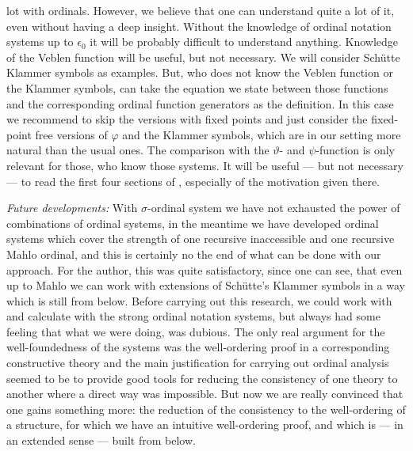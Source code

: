 \documentclass[10pt]{article}
\begin{document}
lot with
ordinals. However, we believe that one can understand quite a lot of it,
even without having a deep insight. Without the knowledge of 
ordinal notation systems up to $\epsilon_0$ it will be probably
difficult to understand
anything. Knowledge of the Veblen function will be 
useful, but not necessary. We will consider
Sch{\"u}tte Klammer symbols as
examples.
But, who does not know the Veblen function or the Klammer symbols,
can take the equation we state between
those functions and the corresponding
ordinal function generators as the definition. In this case 
we  recommend to skip the versions with fixed points and just consider the
fixed-point free versions of $\varphi$ and the Klammer symbols, which
are in our setting more natural than the usual ones.
The comparison with the $\vartheta$-
and $\psi$-function is only relevant for those, who know those systems.
It will be useful --- but not necessary ---   to read the 
first four sections of \cite{setzvenedig}, especially of the  motivation
given there.\par  
{\em Future developments:} With $\sigma$-ordinal system we have not exhausted the power of 
combinations of ordinal systems, in the meantime we have 
developed ordinal systems which cover the strength of 
one recursive inaccessible and one recursive Mahlo ordinal, and
this is certainly
no the end of what can be done with our approach. For the author, this was 
quite satisfactory, since one can see, that even up to Mahlo we can work
with extensions of Sch{\"u}tte's Klammer symbols in a way which is still
from below. Before carrying out this research,
we  could work with and calculate with the strong
ordinal notation systems, but always had some feeling that what we
were doing, was dubious. The only real argument for the
well-foundedness of the systems was the 
well-ordering proof in a corresponding constructive theory and the
main justification for carrying out ordinal analysis seemed to be to 
provide good tools for reducing the consistency of one theory 
to another where a direct way was impossible. But now we are
really convinced that  one gains something more: the reduction of the 
consistency to the well-ordering of a structure, for which we have
an intuitive well-ordering proof, and which is --- in an
extended sense --- built from below.
%
%
%
\end{document}
